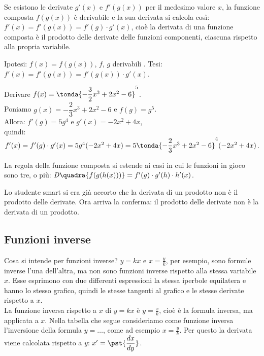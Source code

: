 \begin{teorema}
  \label{teo:diff01_dericomp}
 Se esistono le derivate $g'(x)$ e $f'(g(x))$ per il medesimo valore $x$,
 la funzione composta $f(g(x))$ è derivabile e la sua derivata si calcola
 così: $f'(x)=f'(g(x))=f'(g)\cdot g'(x)$, cioè la derivata di una funzione 
composta è il prodotto delle derivate delle funzioni componenti, 
ciascuna rispetto alla propria variabile.
\end{teorema}
\noindent Ipotesi: $f(x)=f(g(x))$, $f$, $g$ derivabili .\tab 
Tesi: $f'(x)=f'(g(x))=f'(g(x))\cdot g'(x)$.
\begin{esempio}
  Derivare $f(x)=\tonda{-\dfrac{3}{2}x^3+2x^2-6}^5$.\\
  Poniamo $g(x)=-\dfrac{2}{3}x^3+2x^2-6$ e $f(g)=g^5$. \\
  Allora: 
  $f'(g)= 5g^4$ e $g'(x)=-2x^2+4x$, \\
  quindi: 
  $f'(x)=f'(g)\cdot g'(x)=5g^4(-2x^2+4x)=
  5\tonda{-\dfrac{2}{3}x^3+2x^2-6}^4(-2x^2+4x)$.
\end{esempio}
\begin{osservazione}
 La regola della funzione composta si estende ai casi in cui le funzioni 
 in gioco sono tre, o più:
 $\mathit{D}\quadra{f(g(h(x)))}=f'(g)\cdot g'(h)\cdot h'(x)$.
\end{osservazione}
\begin{osservazione}
 Lo studente smart si era già accorto che la derivata di un prodotto non 
 è il prodotto delle derivate. Ora arriva la conferma:
 il prodotto delle derivate non è la derivata di un prodotto.
\end{osservazione}

\subsection{Funzioni inverse}
\label{subsec:diff01_derifuninverse}

 Cosa si intende per funzioni inverse? $y=kx$ e $x=\frac{y}{k}$, per esempio, 
sono formule inverse l'una dell'altra, ma non sono funzioni inverse rispetto 
alla stessa variabile $x$. Esse esprimono con due differenti espressioni la 
stessa iperbole equilatera e hanno lo stesso grafico, quindi le stesse tangenti 
al grafico e le stesse derivate rispetto a $x$.\\
 La funzione inversa rispetto a $x$ di $y=kx$ è $y=\frac{x}{k}$, cioè è
 la formula inversa, ma applicata a $x$. Nella tabella che segue consideriamo 
 come funzione inversa l'inversione della formula $y=\dots$, come ad esempio 
$x=\frac{y}{k}$. Per questo la derivata viene calcolata rispetto a $y$: 
$x'=\pst{\dfrac{dx}{dy}}$.\\

